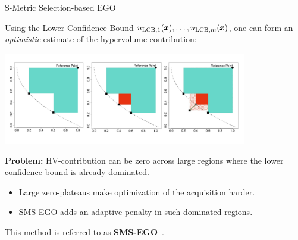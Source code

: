 \documentclass[11pt,compress,t,notes=noshow,xcolor=table]{beamer}
\begin{document}
\begin{vbframe}{S-Metric Selection-based EGO}

Using the Lower Confidence Bound $u_{\text{LCB},1}(\pmb{x}),\dots,u_{\text{LCB},m}(\pmb{x})$,
one can form an \emph{optimistic} estimate of the hypervolume contribution:

\begin{center}
\includegraphics[width=0.8\textwidth]{slides/11-multicrit/figure_man/hv_contribution_2.pdf}
\end{center}

\textbf{Problem:} HV-contribution can be zero across large regions where the lower confidence bound is already dominated.
\begin{itemize}
  \item Large zero-plateaus make optimization of the acquisition harder.
  \item SMS-EGO adds an adaptive penalty in such dominated regions.
\end{itemize}

\medskip

This method is referred to as
\textbf{SMS-EGO}~.

\end{vbframe}
\end{document}
